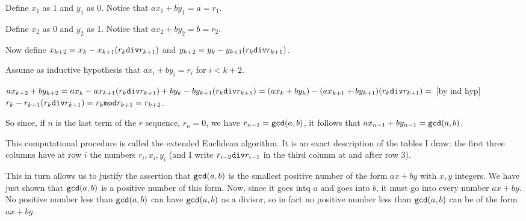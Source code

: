 \documentclass[12pt]{article}
\begin{document}
Define $x_1$ as 1 and $y_1$ as 0.  Notice that $ax_1 +by_1=a=r_1$.

Define $x_2$ as 0 and $y_2$ as 1.  Notice that $ax_2 + by_2 = b = r_2$.

Now define $x_{k+2} = x_k - x_{k+1}(r_k{\tt div}r_{k+1})$ and $y_{k+2} = y_k - y_{k+1}(r_k{\tt div}r_{k+1})$.

Assume as inductive hypothesis that $ax_i + by_i = r_i$ for $i<k+2$.

$ax_{k+2} + by_{k+2} = ax_k - ax_{k+1}(r_k{\tt div}r_{k+1}) +by_k - by_{k+1}(r_k{\tt div}r_{k+1}) =
(ax_k + by_k) - (ax_{k+1}+by_{k+1})(r_k{\tt div}r_{k+1}) = $  [by ind hyp] $r_k - r_{k+1}(r_k{\tt div}r_{k+1})  = r_k{\tt mod}r_{k+1} = r_{k+2}$.

So since, if $n$ is the last term of the $r$ sequence, $r_n=0$, we have $r_{n-1} = {\tt gcd}(a,b)$, it follows
that $ax_{n-1}+by_{n-1}={\tt gcd}(a,b)$.

This computational procedure is called the extended Euclidean algorithm.  It is an exact description of the tables I draw:  the first three columns have at row $i$ the numbers $r_i, x_i, y_i$ (and I write $r_{i-2}{\tt div}r_{i-1}$ in the third column at and after row 3).

This in turn allows us to justify the assertion that ${\tt gcd}(a,b)$ is the smallest positive number of the form $ax+by$ with $x,y$ integers.  We have just shown that ${\tt gcd}(a,b)$ is a positive number of this form.  Now, since it goes intq $a$ and goes into $b$, it must go into every number $ax+by$.  No positive number less than ${\tt gcd}(a,b)$ can have ${\tt gcd}(a,b)$ as a divisor, so in fact no positive number less than ${\tt gcd}(a,b)$ can be of the form $ax+by$.
\end{document}
